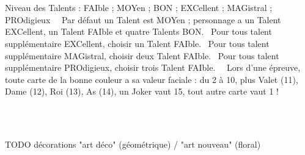 \documentclass[a5paper]{letter}
\begin{document}
{{{{\clearpage

	~\\~\\

\begin{minipage}[ht]{0.75\textwidth}
	Niveau des Talents : FAIble ; MOYen ; BON ; EXCellent ; MAGistral ; PROdigieux~\newline~\newline
	Par défaut un Talent est MOYen ; personnage a un Talent EXCellent, un Talent FAIble et quatre Talents BON.~\newline
	Pour tous talent supplémentaire EXCellent, choisir un Talent FAIble.~\newline
	Pour tous talent supplémentaire MAGistral, choisir deux Talent FAIble.~\newline
	Pour tous talent supplémentaire PROdigieux, choisir trois Talent FAIble.~\newline~\newline
	Lors d'une épreuve, toute carte de la bonne couleur a sa valeur faciale : du 2 à 10, plus Valet (11), Dame (12), Roi (13), As (14), un Joker vaut 15, tout autre carte vaut 1 !
\end{minipage}~\\~\\


\clearpage

TODO décorations "art déco" (géométrique) / "art nouveau" (floral)

}}}}
\end{document}
